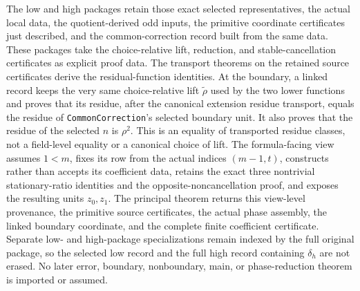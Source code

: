 \begin{definition}
The low and high packages retain those exact selected representatives, the
actual local data, the quotient-derived odd inputs, the primitive coordinate
certificates just described, and the common-correction record built from the
same data.  These packages take the choice-relative lift, reduction, and
stable-cancellation certificates as explicit proof data.  The transport
theorems on the retained source certificates derive the residual-function
identities.  At the boundary, a linked record keeps the very same
choice-relative lift \(\widetilde\rho\) used by the two lower functions and
proves that its residue, after the canonical extension residue transport,
equals the residue of \texttt{CommonCorrection}'s selected boundary unit.  It
also proves that the residue of the selected \(n\) is \(\rho^2\).  This is an
equality of transported residue classes, not a field-level equality or a
canonical choice of lift.  The formula-facing view assumes \(1<m\), fixes its
row from the actual indices \((m-1,t)\), constructs rather than accepts its
coefficient data, retains the exact three nontrivial stationary-ratio
identities and the opposite-noncancellation proof, and exposes the resulting
units \(z_0,z_1\).
The principal theorem returns this view-level provenance, the primitive
source certificates, the actual phase assembly, the linked boundary
coordinate, and the complete finite coefficient certificate.  Separate low-
and high-package specializations remain indexed by the full original package,
so the selected low record and the full high record containing \(\delta_h\)
are not erased.
No later error, boundary, nonboundary, main, or phase-reduction theorem is
imported or assumed.


\end{definition}
